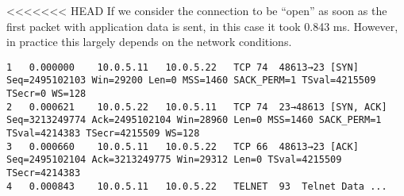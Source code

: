 <<<<<<< HEAD
If we consider the connection to be ``open'' as soon as the first packet with application data is sent, in this case it took 0.843 ms. However, in practice this largely depends on the network conditions.

\begin{lstlisting}
1	0.000000	10.0.5.11	10.0.5.22	TCP	74	48613→23 [SYN] Seq=2495102103 Win=29200 Len=0 MSS=1460 SACK_PERM=1 TSval=4215509 TSecr=0 WS=128
2	0.000621	10.0.5.22	10.0.5.11	TCP	74	23→48613 [SYN, ACK] Seq=3213249774 Ack=2495102104 Win=28960 Len=0 MSS=1460 SACK_PERM=1 TSval=4214383 TSecr=4215509 WS=128
3	0.000660	10.0.5.11	10.0.5.22	TCP	66	48613→23 [ACK] Seq=2495102104 Ack=3213249775 Win=29312 Len=0 TSval=4215509 TSecr=4214383
4	0.000843	10.0.5.11	10.0.5.22	TELNET	93	Telnet Data ...
\end{lstlisting}

